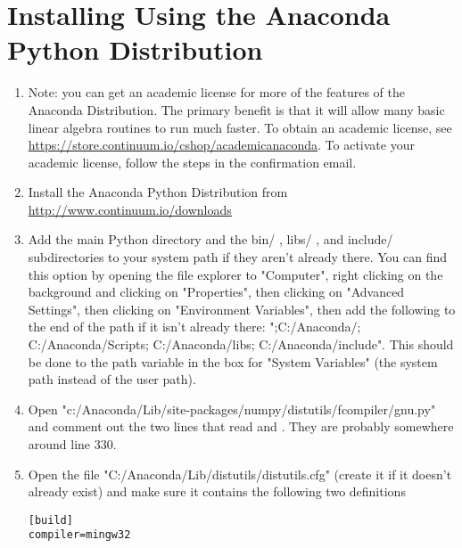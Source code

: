 \section*{Installing Using the Anaconda Python Distribution}
\begin{enumerate}
\item Note: you can get an academic license for more of the features of the Anaconda Distribution.
The primary benefit is that it will allow many basic linear algebra routines to run much faster.
To obtain an academic license, see \url{https://store.continuum.io/cshop/academicanaconda}.
To activate your academic license, follow the steps in the confirmation email.

\item Install the Anaconda Python Distribution from \url{http://www.continuum.io/downloads}

\item Add the main Python directory and the bin/ , libs/ , and include/ subdirectories to your system path if they aren't already there.
You can find this option by opening the file explorer to "Computer", right clicking on the background and clicking on "Properties", then clicking on "Advanced Settings", then clicking on "Environment Variables", then add the following to the end of the path if it isn't already there: ";C:/Anaconda/; C:/Anaconda/Scripts; C:/Anaconda/libs; C:/Anaconda/include". This should be done to the path variable in the box for "System Variables" (the system path instead of the user path).

\item Open "c:/Anaconda/Lib/site-packages/numpy/distutils/fcompiler/gnu.py" and comment out the two lines that read  and .
They are probably somewhere around line $330$.

\item Open the file "C:/Anaconda/Lib/distutils/distutils.cfg" (create it if it doesn't already exist) and make sure it contains the following two definitions
\begin{lstlisting}
[build]
compiler=mingw32


\end{lstlisting}
\end{enumerate}
